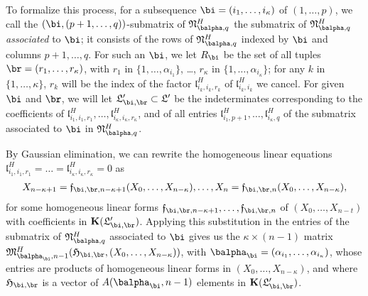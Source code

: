 \documentclass[12pt]{article}
\begin{document}
To formalize this process, for a subsequence
$\bi=(i_1,\dots,i_\kappa)$ of $(1,\dots,p)$, we call the
$(\bi,(p+1,\dots,q))$-submatrix of $\mathfrak{N}^H_{\balpha,q}$ the submatrix of
$\mathfrak{N}^H_{\balpha,q}$ {\em associated} to $\bi$; it consists of the rows of
$\mathfrak{N}^H_{\balpha,q}$ indexed by $\bi$ and columns $p+1,\dots,q$.
For such an $\bi$, we let $R_\bi$ be the set of
all tuples $\br=(r_1,\dots,r_\kappa)$, with $r_1$ in
$\{1,\dots,\alpha_{i_1}\}$, \dots, $r_\kappa$ in
$\{1,\dots,\alpha_{i_\kappa}\}$; for any $k$ in $\{1,\dots,\kappa\}$,
$r_k$ will be the index of the factor $\mathfrak{l}^H_{i_k,i_k,r_k}$
of $\mathfrak{l}^H_{i_k,i_k}$ we cancel. For given $\bi$ and $\br$,
we will let $\mathfrak{L}'_{\bi,\br} \subset \mathfrak{L}'$ be the
indeterminates corresponding to the coefficients of
$\mathfrak{l}^H_{i_1,i_1,r_1},\dots,\mathfrak{l}^H_{i_\kappa,i_\kappa,r_\kappa}$, and
of all entries $\mathfrak{l}^H_{i_1,p+1},\dots,\mathfrak{l}^H_{i_\kappa,q}$
of the submatrix associated to $\bi$ in $\mathfrak{N}^H_{\balpha,q}$.



By Gaussian elimination, we can rewrite the homogeneous linear
equations
$\mathfrak{l}^H_{i_1,i_1,r_1}=\dots=\mathfrak{l}^H_{i_\kappa,i_\kappa,r_\kappa}=0$ as
\begin{align}\label{eq:f_sr}
X_{n-\kappa+1}=\mathfrak{f}_{\bi,\br,n-\kappa+1}(X_0,\dots,X_{n-\kappa}),\dots,X_{n}=\mathfrak{f}_{\bi,\br,n}(X_0,\dots,X_{n-\kappa}),  
\end{align}
for some homogeneous linear forms
$\mathfrak{f}_{\bi,\br,n-\kappa+1},\dots,\mathfrak{f}_{\bi,\br,n}$ of
$(X_0,\dots,X_{n-t})$ with coefficients in
$\KK(\mathfrak{L}'_{\bi,\br})$. Applying this substitution in the
entries of the submatrix of ${\mathfrak{N}^H_{\balpha,q}}$ associated
to $\bi$ gives us the $\kappa \times (n-1)$ matrix
$\mathfrak{M}^H_{\balpha_\bi,n-1}(\mathfrak{H}_{\bi,\br},(X_0,\dots,X_{n-\kappa}))$,
with $\balpha_\bi=(\alpha_{i_1},\dots,\alpha_{i_\kappa})$, whose
entries are products of homogeneous linear forms in
$(X_0,\dots,X_{n-\kappa})$, and where $\mathfrak{H}_{\bi,\br}$ is a
vector of $A(\balpha_\bi,n-1)$ elements in $\KK(\mathfrak{L}'_{\bi,\br})$.
\end{document}
